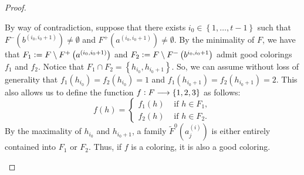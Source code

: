 \documentclass[12pt]{article}
\theoremstyle{definition}
\newcommand{\defeq}{\vcentcolon=}
\begin{document}
\begin{proof}
\begin{itemize}
             By way of contradiction,
             suppose that there exists
             $i_0 \in \left\{1, \ldots, t-1\right\}$
             such that $F^{-}\left(b^{\left(i_0, i_0+1\right)}\right)
             \neq \emptyset$ and
             $F^{+}\left(a^{\left(i_0, i_0+1\right)}\right)
             \neq \emptyset$.
             By the minimality of $F$, 
             we have that
             $F_1 \defeq F \setminus F^{+}
             \left(a^{\left(i_0, i_0+1\right)}\right)$
             and
             $F_2 \defeq F \setminus F^{-}
             \left(b^{i_0,i_0+1}\right)$ 
             admit good colorings
             $f_1$ and $f_2$.
             Notice that $F_1 \cap F_2 = 
             \left\{h_{i_0}, h_{i_0+1}\right\}$.
             So, we can assume without loss
             of generality that
             $f_1\left(h_{i_0}\right) = 
             f_2\left(h_{i_0}\right) = 1$ 
             and $f_1\left(h_{i_0+1}\right) =
             f_2\left(h_{i_0+1}\right) =2$.
             This also allows us to define 
             the function $f \vcentcolon 
             F \longrightarrow \left\{1, 2, 3\right\}$ 
             as follows:
             \begin{equation*}
                f\left(h\right) = 
                \begin{cases}
                    f_1\left(h\right) &\text{ if } h \in F_1, \\
                    f_2\left(h\right) &\text{ if } h \in F_{2}.
                \end{cases}
            \end{equation*} 
             By the maximality
             of $h_{i_0}$ and $h_{i_0+1}$,
             a family
             $\widetilde{F}^{0}\left(a_{j}^{\left(i\right)}\right)$
             is either entirely contained
             into $F_1$ or $F_2$.
             Thus, if $f$ is a coloring,
             it is also a good coloring.


\end{itemize}
\end{proof}
\end{document}
